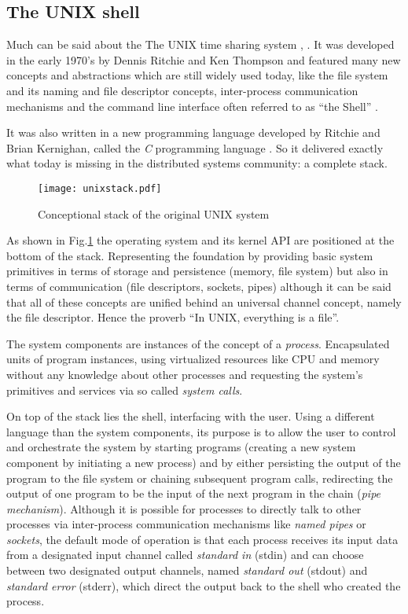 \subsection{The UNIX shell}
\label{bash}
Much can be said about the The UNIX time sharing system
\cite{unix78}, \cite{unixdesign}. It was developed in the early
1970's by Dennis Ritchie and Ken Thompson and featured many
new concepts and abstractions which are still widely used today,
like the file system and its naming and file descriptor concepts,
inter-process communication mechanisms and the command line interface
often referred to as ``the Shell'' \cite{unix78}.

It was also written in a new programming language developed by
Ritchie and Brian Kernighan, called the \textit{C} programming
language \cite{c}. So it delivered exactly what today is missing
in the distributed systems community: a complete stack.

\begin{figure}[h]
  \texttt{[image: unixstack.pdf]}
  \caption{Conceptional stack of the original UNIX system}
  \label{unixstack}
\end{figure}

As shown in Fig.\ref{unixstack} the operating system and its
kernel API are positioned at the bottom of the stack. Representing the
foundation by providing basic system primitives in terms of
storage and persistence (memory, file system) but also in terms of
communication (file descriptors, sockets, pipes) although it can be
said that all of these concepts are unified behind an universal channel
concept, namely the file descriptor. Hence the proverb ``In UNIX,
everything is a file''.

The system components are instances of the concept of a \textit{process}.
Encapsulated units of program instances, using virtualized resources like
CPU and memory without any knowledge about other processes and requesting
the system's primitives and services via so called \textit{system calls}.

On top of the stack lies the shell, interfacing with the user.
Using a different language than the system components, its purpose is
to allow the user to control and orchestrate the system by starting
programs (creating a new system component by initiating a new process)
and by either persisting the output of the program to the file system or
chaining subsequent program calls, redirecting the output of one
program to be the input of the next program in the chain
(\textit{pipe mechanism}). Although it is possible for processes
to directly talk to other processes via inter-process communication
mechanisms like \textit{named pipes} or \textit{sockets}, the default
mode of operation is that each process receives its input data from
a designated input channel called \textit{standard in} (stdin) and
can choose between two designated output channels, named
\textit{standard out} (stdout) and \textit{standard error} (stderr),
which direct the output back to the shell who created the process.

